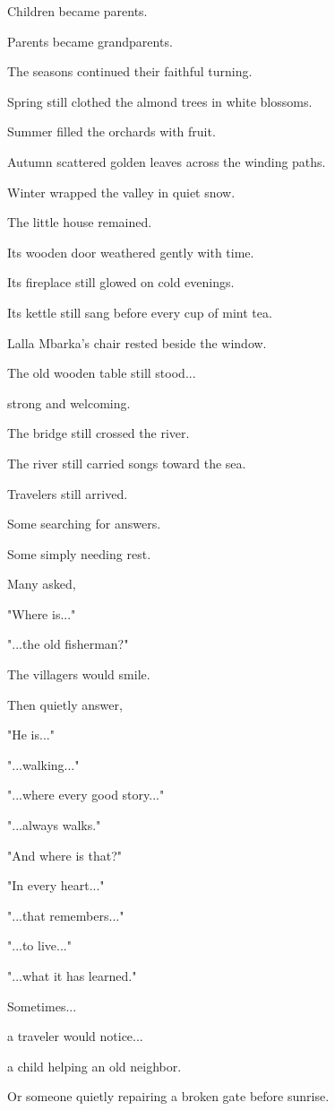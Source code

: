 \documentclass[12pt,openany]{book}
\begin{document}
Children became parents.

Parents became grandparents.

The seasons continued their faithful turning.

Spring still clothed the almond trees in white blossoms.

Summer filled the orchards with fruit.

Autumn scattered golden leaves across the winding paths.

Winter wrapped the valley in quiet snow.

The little house remained.

Its wooden door weathered gently with time.

Its fireplace still glowed on cold evenings.

Its kettle still sang before every cup of mint tea.

Lalla Mbarka's chair rested beside the window.

The old wooden table still stood...

strong and welcoming.

The bridge still crossed the river.

The river still carried songs toward the sea.

Travelers still arrived.

Some searching for answers.

Some simply needing rest.

Many asked,

"Where is..."

"...the old fisherman?"

The villagers would smile.

Then quietly answer,

"He is..."

"...walking..."

"...where every good story..."

"...always walks."

"And where is that?"

"In every heart..."

"...that remembers..."

"...to live..."

"...what it has learned."

Sometimes...

a traveler would notice...

a child helping an old neighbor.

Or someone quietly repairing a broken gate before sunrise.
\end{document}
